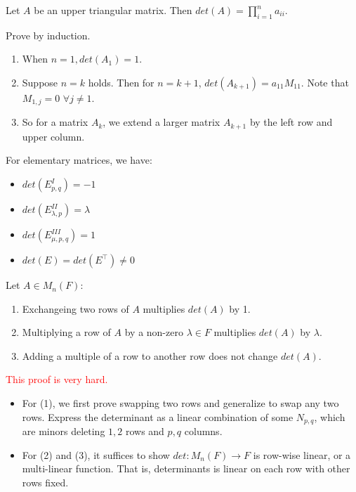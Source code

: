 \documentclass[12pt]{article}
\begin{document}
\begin{example}
    Let $A$ be an upper triangular matrix. Then $det(A)=\prod_{i=1}^{n}a_{ii}.$
\end{example}

\begin{pf}
    Prove by induction. 
    \begin{enumerate}
        \item When $n=1, det(A_1)=1$.
        \item Suppose $n=k$ holds. Then for $n=k+1$, $det(A_{k+1})=a_{11}M_{11}.$ 
        Note that $M_{1,j}=0\,\, \forall j\neq 1$. 
        \item So for a matrix $A_k$, we extend a larger matrix $A_{k+1}$ by the left row and upper column.
    \end{enumerate}
\end{pf}

\begin{theorem}
    For elementary matrices, we have:
    \begin{itemize}
        \item $det(E^I_{p,q})=-1$
        \item $det(E^{II}_{\lambda,p})=\lambda$
        \item $det(E^{III}_{\mu,p,q})=1$
        \item $det(E)=det(E^\top)\neq 0$
    \end{itemize}
\end{theorem}


\begin{theorem}
    Let $A\in M_n(F)$:
    \begin{enumerate}
        \item Exchangeing two rows of $A$ multiplies $det(A)$ by 1.
        \item Multiplying a row of $A$ by a non-zero $\lambda\in F$ multiplies $det(A)$ by $\lambda$.
        \item Adding a multiple of a row to another row does not change $det(A)$.
    \end{enumerate}
\end{theorem}

\begin{pf}
    \textcolor{red}{This proof is very hard.}
    \begin{itemize}
        \item For (1), we first prove swapping two rows and generalize to swap any two rows. Express the determinant as a linear combination of some $N_{p,q}$, which are minors deleting $1,2$ rows and $p,q$ columns.
        \item For (2) and (3), it suffices to show $det: M_n(F)\rightarrow F$ is row-wise linear, or a multi-linear function. That is, determinants is linear on each row with other rows fixed.
    \end{itemize}
\end{pf}
\end{document}
